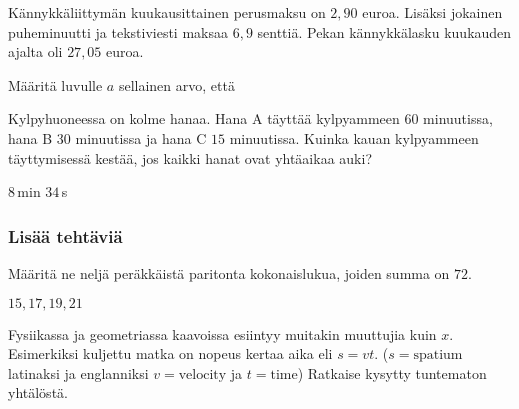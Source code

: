 \begin{tehtavasivu}
\begin{tehtava}
Kännykkäliittymän kuukausittainen perusmaksu on $2,90$ euroa. Lisäksi jokainen puheminuutti ja tekstiviesti maksaa $6,9$ senttiä. Pekan kännykkälasku kuukauden ajalta oli $27,05$ euroa.


	\begin{vastaus}
	\end{vastaus}
\end{tehtava}

\begin{tehtava}
Määritä luvulle $a$ sellainen arvo, että
\begin{vastaus}
\end{vastaus}
\end{tehtava}


\begin{tehtava} %
Kylpyhuoneessa on kolme hanaa. Hana A täyttää kylpyammeen $60$ minuutissa, hana B $30$ minuutissa ja hana C $15$ minuutissa. Kuinka kauan kylpyammeen täyttymisessä kestää, jos kaikki hanat ovat yhtäaikaa auki?
\begin{vastaus}
$8$\,min $34$\,s
\end{vastaus}
\end{tehtava}

\subsubsection*{Lisää tehtäviä}

\begin{tehtava}
Määritä ne neljä peräkkäistä paritonta kokonaislukua, joiden summa on $72$.
	\begin{vastaus}
	 $15, 17, 19, 21$
	\end{vastaus}
\end{tehtava}


\begin{tehtava}
Fysiikassa ja geometriassa kaavoissa esiintyy muitakin muuttujia kuin $x$. Esimerkiksi kuljettu matka on nopeus kertaa aika eli $s=vt$. ($s= \text{spatium}$ latinaksi ja englanniksi $v= \text{velocity}$ ja $t= \text{time}$) Ratkaise kysytty tuntematon yhtälöstä.


\end{tehtava}
\end{tehtavasivu}
